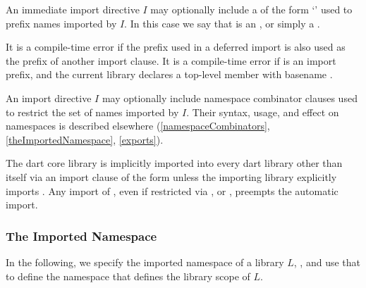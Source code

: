 \documentclass[makeidx]{article}
\begin{document}
{\LMHash{}%
An immediate import directive $I$ may optionally include
a  of the form `\code{\AS{}\,\,\id}' used to prefix
names imported by $I$.
In this case we say that \id{} is an ,
or simply a .


\LMHash{}%
It is a compile-time error if the prefix used in a deferred import
is also used as the prefix of another import clause.
It is a compile-time error if \id{} is an import prefix,
and the current library declares a top-level member with basename \id{}.

\LMHash{}%
An import directive $I$ may optionally include namespace combinator clauses
used to restrict the set of names imported by $I$.
Their syntax, usage, and effect on namespaces is described elsewhere
(\ref{namespaceCombinators}, \ref{theImportedNamespace},
\ref{exports}).

\LMHash{}%
The dart core library 
is implicitly imported into every dart library other than itself
via an import clause of the form
unless the importing library explicitly imports .
Any import of ,
even if restricted via \SHOW{}, \HIDE{} or \AS{},
preempts the automatic import.


\subsubsection{The Imported Namespace}

\LMHash{}%
In the following, we specify the imported namespace of a library $L$,
,
and use that to define the namespace that defines the library scope of $L$.

}
\end{document}
